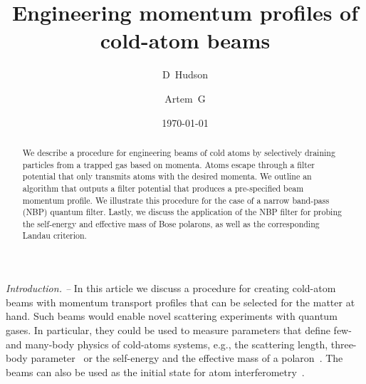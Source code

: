 \documentclass[reprint, twocolumn,amsmath,amssymb,showpacs,pra,superscriptaddress,aps]{revtex4-1}
\begin{document}
\title{Engineering momentum profiles of cold-atom beams}

\author{D~Hudson }

\author{Artem~G }


\date{\today}

\begin{abstract}
We describe a procedure for engineering beams of cold atoms by selectively draining particles from a trapped gas based on momenta. Atoms escape through a filter potential that only transmits atoms with the desired momenta. We outline an algorithm that outputs a filter potential that produces a pre-specified beam momentum profile. We illustrate this procedure for the case of a narrow band-pass (NBP) quantum filter. Lastly, we discuss the application of the NBP filter for probing the self-energy and effective mass of Bose polarons, as well as the corresponding Landau criterion.
\end{abstract}


\maketitle



{\it Introduction. --}   
In this article we discuss a procedure for creating cold-atom beams with momentum transport profiles that can be selected for the matter at hand.
Such beams would enable novel scattering experiments with quantum gases. In particular, 
they could be used to measure parameters that define
few- and many-body physics of cold-atoms systems, e.g., the
scattering length, three-body parameter~\cite{braaten2006, bloch2008} or
the self-energy and the effective mass of a polaron~\cite{massignan2014, schmidt2018}.
The beams can also be used as the initial state for atom interferometry~\cite{Impens2006,Cronin2009}.
\end{document}
